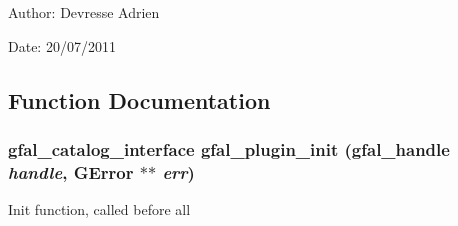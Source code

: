 \begin{Desc}
\item[Author:]Devresse Adrien \end{Desc}
\begin{Desc}
\item[Date:]20/07/2011 \end{Desc}


\subsection{Function Documentation}
\subsubsection{\setlength{\rightskip}{0pt plus 5cm}gfal\_\-catalog\_\-interface gfal\_\-plugin\_\-init (gfal\_\-handle {\em handle}, GError $\ast$$\ast$ {\em err})}\label{gfal__dcap__plugin__main_8h_5c9edde4d67d96432a319d940a4799f1}


Init function, called before all 